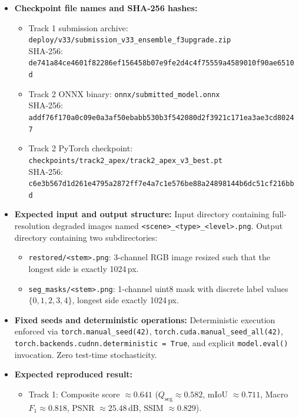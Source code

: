 \documentclass{article}
\begin{document}
\begin{itemize}[leftmargin=*]
\begin{verbatim}
# Track 2 (ONNX Runtime / TensorRT Inference):
python deploy/run_onnx_inference.py --onnx onnx/submitted_model.onnx \
                                    --input-dir /path/to/test_images \
                                    --output-dir /path/to/outputs
\end{verbatim}
\item \textbf{Checkpoint file names and SHA-256 hashes:}
  \begin{itemize}
    \item Track 1 submission archive: \texttt{deploy/v33/submission\_v33\_ensemble\_f3upgrade.zip} \\
    SHA-256: \texttt{de741a84ce4601f82286ef156458b07e9fe2d4c4f75559a4589010f90ae6510d}
    \item Track 2 ONNX binary: \texttt{onnx/submitted\_model.onnx} \\
    SHA-256: \texttt{addf76f170a0c09e0a3af50ebabb530b3f542080d2f3921c171ea3ae3cd80247}
    \item Track 2 PyTorch checkpoint: \texttt{checkpoints/track2\_apex/track2\_apex\_v3\_best.pt} \\
    SHA-256: \texttt{c6e3b567d1d261e4795a2872ff7e4a7c1e576be88a24898144b6dc51cf216bbd}
  \end{itemize}
\item \textbf{Expected input and output structure:}
  Input directory containing full-resolution degraded images named \texttt{<scene>\_<type>\_<level>.png}. Output directory containing two subdirectories:
  \begin{itemize}
    \item \texttt{restored/<stem>.png}: 3-channel RGB image resized such that the longest side is exactly 1024\,px.
    \item \texttt{seg\_masks/<stem>.png}: 1-channel uint8 mask with discrete label values $\{0, 1, 2, 3, 4\}$, longest side exactly 1024\,px.
  \end{itemize}
\item \textbf{Fixed seeds and deterministic operations:}
  Deterministic execution enforced via \texttt{torch.manual\_seed(42)}, \texttt{torch.cuda.manual\_seed\_all(42)}, \texttt{torch.backends.cudnn.deterministic = True}, and explicit \texttt{model.eval()} invocation. Zero test-time stochasticity.
\item \textbf{Expected reproduced result:}
  \begin{itemize}
    \item Track 1: Composite score $\approx \mathbf{0.641}$ ($Q_{\text{seg}} \approx 0.582$, mIoU $\approx 0.711$, Macro $F_1 \approx 0.818$, PSNR $\approx 25.48$\,dB, SSIM $\approx 0.829$).

\end{itemize}
\end{itemize}
\end{document}
